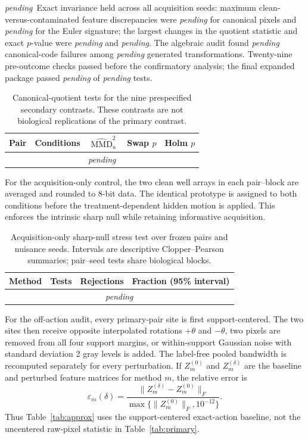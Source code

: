 \documentclass[11pt]{article}
\theoremstyle{plain}
\theoremstyle{definition}
\numberwithin{equation}{section}
\DeclareMathOperator{\MMD}{MMD}
\newcommand{\1}{\mathbf 1}
\newcommand{\pending}{\textnormal{\textit{pending}}}
\providecommand{\SoftwareTestsPassed}{\pending}
\providecommand{\RxInvariantAuditTrials}{\pending}
\providecommand{\RxInvariantAuditFailures}{\pending}
\providecommand{\RxReplicationSummary}{\pending}
\providecommand{\RxReplicationRows}{\multicolumn{5}{c}{\pending}\\}
\providecommand{\RxAcquisitionNullRows}{\multicolumn{4}{c}{\pending}\\}
\providecommand{\RxMaxQuotientFeatureError}{\pending}
\providecommand{\RxMaxEulerFeatureError}{\pending}
\providecommand{\RxMaxQuotientStatisticError}{\pending}
\providecommand{\RxMaxQuotientPError}{\pending}
\begin{document}
\RxReplicationSummary\ Exact invariance held across all acquisition seeds:
maximum clean-versus-contaminated feature discrepancies were
\RxMaxQuotientFeatureError{} for canonical pixels and
\RxMaxEulerFeatureError{} for the Euler signature; the largest changes in the
quotient statistic and exact $p$-value were
\RxMaxQuotientStatisticError{} and \RxMaxQuotientPError. The algebraic audit
found \RxInvariantAuditFailures{} canonical-code failures among
\RxInvariantAuditTrials{} generated transformations. Twenty-nine pre-outcome
checks passed before the confirmatory analysis; the final expanded package
passed \SoftwareTestsPassed{} of \SoftwareTestsPassed{} tests.

\begin{table}[!htbp]
\caption{Canonical-quotient tests for the nine prespecified secondary contrasts. These contrasts are not biological replications of the primary contrast.\label{tab:secondary}}
\centering\scriptsize
\begin{tabular}{@{}clrrr@{}}
\toprule
Pair & Conditions & $\widehat{\MMD}_u^2$ & Swap $p$ & Holm $p$\\
\midrule
\RxReplicationRows
\bottomrule
\end{tabular}
\end{table}

For the acquisition-only control, the two clean well arrays in each
pair--block are averaged and rounded to 8-bit data. The identical prototype is
assigned to both conditions before the treatment-dependent hidden motion is
applied. This enforces the intrinsic sharp null while retaining informative
acquisition.

\begin{table}[t]
\caption{Acquisition-only sharp-null stress test over frozen pairs and nuisance seeds. Intervals are descriptive Clopper--Pearson summaries; pair--seed tests share biological blocks.\label{tab:sharpnull}}
\centering\small
\begin{tabular}{@{}lrrl@{}}
\toprule
Method & Tests & Rejections & Fraction (95\% interval)\\
\midrule
\RxAcquisitionNullRows
\bottomrule
\end{tabular}
\end{table}

For the off-action audit, every primary-pair site is first support-centered.
The two sites then receive opposite interpolated rotations $+\theta$ and
$-\theta$, two pixels are removed from all four support margins, or
within-support Gaussian noise with standard deviation 2 gray levels is added.
The label-free pooled bandwidth is recomputed separately for every
perturbation. If $Z_m^{(0)}$ and $Z_m^{(\delta)}$ are the baseline and
perturbed feature matrices for method $m$, the relative error is
\[
\varepsilon_m(\delta)=
\frac{\|Z_m^{(\delta)}-Z_m^{(0)}\|_F}
{\max\{\|Z_m^{(0)}\|_F,10^{-12}\}}.
\]
Thus Table~\ref{tab:approx} uses the support-centered exact-action baseline,
not the uncentered raw-pixel statistic in Table~\ref{tab:primary}.
\end{document}
